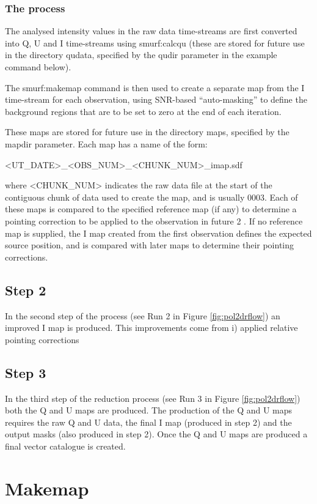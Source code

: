 \subsubsection*{The process}
The  analysed  intensity values in the raw data time-streams are first converted into Q, U and I time-streams
using smurf:calcqu (these are stored for future use in the directory qudata, specified by the qudir parameter in the example command below). 

The smurf:makemap command is then used to create a separate map from the I time-stream for each observation, using SNR-based “auto-masking” to define the background regions that are to be set to zero at the end of each iteration.  

These maps are stored for future use in the directory maps, specified by the mapdir parameter. Each map has a name of the form:

<UT_DATE>_<OBS_NUM>_<CHUNK_NUM>_imap.sdf

where <CHUNK_NUM> indicates the raw data file at the start of the contiguous chunk of data used to create the map, and is
usually 0003. Each of these maps is compared to the specified reference map (if any) to determine a pointing correction to be applied to the observation in future
2 . If no reference map is supplied, the I map created from the first observation defines the expected source position, and is compared with later maps to determine their pointing corrections.


\subsection*{Step 2}

In the second step of the process (see Run 2 in Figure \ref{fig:pol2drflow}) an improved I map is produced. This improvements come from i) applied relative pointing corrections 


\subsection*{Step 3}

In the third step of the reduction process (see Run 3 in Figure \ref{fig:pol2drflow}) both the Q and U maps are produced. The production of the Q and U maps requires the raw Q and U data, the final I map (produced in step 2) and the output masks (also produced in step 2). Once the Q and U maps are produced a final vector catalogue is created.

\section{Makemap}

